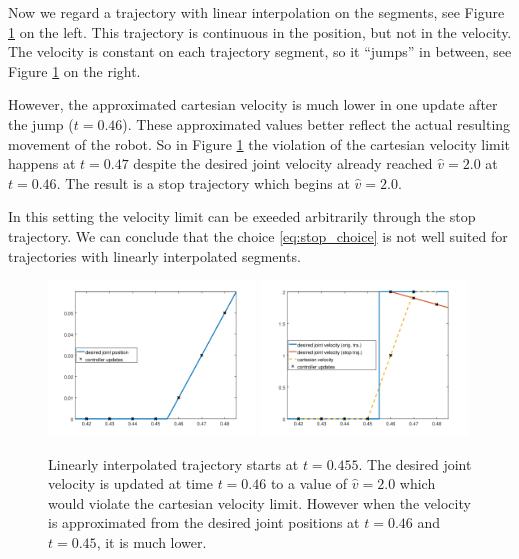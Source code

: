 \documentclass{article}
\begin{document}
Now we regard a trajectory with linear interpolation on the segments, see Figure \ref{fig:stop_failure} on the left. This trajectory is continuous in the position, but not in the velocity. The velocity is constant on each trajectory segment, so it ``jumps'' in between, see Figure \ref{fig:stop_failure} on the right.

However, the approximated cartesian velocity is much lower in one update after the jump ($t=0.46$). These approximated values better reflect the actual resulting movement of the robot. So in Figure \ref{fig:stop_failure} the violation of the cartesian velocity limit happens at $t=0.47$ despite the desired joint velocity already reached $\hat{v}=2.0$ at $t=0.46$. The result is a stop trajectory which begins at $\hat{v}=2.0$.

In this setting the velocity limit can be exeeded arbitrarily through the stop trajectory. We can conclude that the choice \eqref{eq:stop_choice} is not well suited for trajectories with linearly interpolated segments.

\begin{figure}
\centering
\includegraphics[width=0.49\textwidth]{figures/stop_failure_position_plot.png}
\includegraphics[width=0.49\textwidth]{figures/stop_failure_velocity_plot.png}
\caption{Linearly interpolated trajectory starts at $t=0.455$. The desired joint velocity is updated at time $t=0.46$ to a value of $\hat{v}=2.0$ which would violate the cartesian velocity limit. However when the velocity is approximated from the desired joint positions at $t=0.46$ and $t=0.45$, it is much lower.}
\label{fig:stop_failure}
\end{figure}
\end{document}
